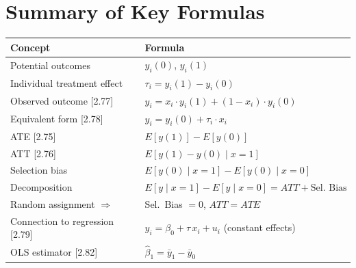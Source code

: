 \documentclass[11pt,a4paper]{article}
\begin{document}
\section*{Summary of Key Formulas}

\begin{center}
\renewcommand{\arraystretch}{1.6}
\begin{tabular}{ll}
\toprule
\textbf{Concept} & \textbf{Formula} \\
\midrule
Potential outcomes & $y_i(0)$,\; $y_i(1)$ \\
Individual treatment effect & $\tau_i = y_i(1) - y_i(0)$ \\
Observed outcome [2.77] & $y_i = x_i \cdot y_i(1) + (1-x_i)\cdot y_i(0)$ \\
Equivalent form [2.78] & $y_i = y_i(0) + \tau_i \cdot x_i$ \\
ATE [2.75] & $E[y(1)] - E[y(0)]$ \\
ATT [2.76] & $E[y(1) - y(0) \mid x=1]$ \\
Selection bias & $E[y(0) \mid x{=}1] - E[y(0) \mid x{=}0]$ \\
Decomposition & $E[y \mid x{=}1] - E[y \mid x{=}0] = ATT + \text{Sel.\ Bias}$ \\
Random assignment $\Rightarrow$ & Sel.\ Bias $= 0$,\; $ATT = ATE$ \\
Connection to regression [2.79] & $y_i = \beta_0 + \tau\, x_i + u_i$ (constant effects) \\
OLS estimator [2.82] & $\hat{\beta}_1 = \bar{y}_1 - \bar{y}_0$ \\
\bottomrule
\end{tabular}
\end{center}
\end{document}
